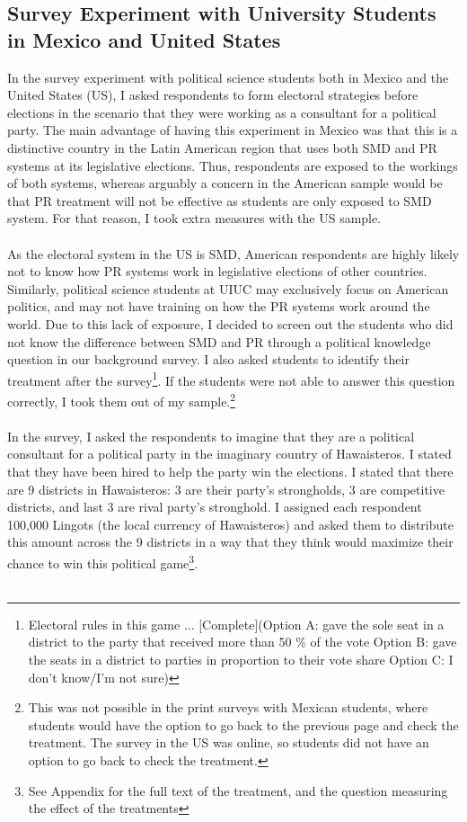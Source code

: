 \documentclass{article}
\begin{document}
\subsection{Survey Experiment with University Students in Mexico and United States}
In the survey experiment with political science students both in Mexico and the United States (US), I asked respondents to form electoral strategies before elections in the scenario that they were working as a consultant for a political party. The main advantage of having this experiment in Mexico was that this is a distinctive country in the Latin American region that uses both SMD and PR systems at its legislative elections. Thus, respondents are exposed to the workings of both systems, whereas arguably a concern in the American sample would be that PR treatment will not be effective as students are only exposed to SMD system.  For that reason, I took extra measures with the US sample.\\
\\
As the electoral system in the US is SMD, American respondents are highly likely not to know how PR systems work in legislative elections of other countries. Similarly, political science students at UIUC may exclusively focus on American politics, and may not have training on how the PR systems work around the world. Due to this lack of exposure, I decided to screen out the students who did not know the difference between SMD and PR through a political knowledge question in our background survey. I also asked students to identify their treatment after the survey\footnote{Electoral rules in this game ... [Complete](Option A: gave the sole seat in a district to the party that received more than 50 \% of the vote Option B: gave the seats in a district to parties in proportion to their vote share Option C: I don't know/I'm not sure)}. If the students were not able to answer this question correctly, I took them out of my sample.\footnote{This was not possible in the print surveys with Mexican students, where students would have the option to go back to the previous page and check the treatment. The survey in the US was online, so students did not have an option to go back to check the treatment. }\\
\\
In the survey, I asked the respondents to imagine that they are a political consultant for a political party in the imaginary country of Hawaisteros. I stated that they have been hired to help the party win the elections. I stated that there are 9 districts in Hawaisteros: 3 are their party's strongholds, 3 are competitive districts, and last 3 are rival party's stronghold. I assigned each respondent 100,000 Lingots (the local currency of Hawaisteros) and asked them to distribute this amount across the 9 districts in a way that they think would maximize their chance to win this political game\footnote{See Appendix for the full text of the treatment, and the question measuring the effect of the treatments}.\\
\\
\end{document}

